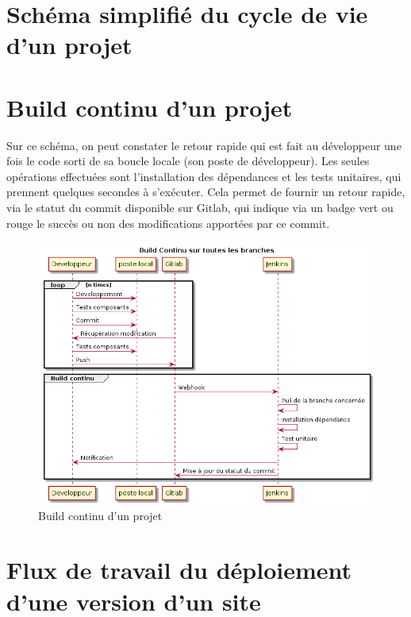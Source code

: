 \section{Schéma simplifié du cycle de vie d'un projet}

\clearpage
\section{Build continu d'un projet \naq}

Sur ce schéma, on peut constater le retour rapide qui est fait au développeur une fois le code sorti de sa boucle locale (son poste de développeur). Les seules opérations effectuées sont l'installation des dépendances et les tests unitaires, qui prennent quelques secondes à s'exécuter. Cela permet de fournir un retour rapide, via le statut du commit disponible sur Gitlab, qui indique via un badge vert ou rouge le succès ou non des modifications apportées par ce commit.

\begin{figure}[ht]
	\centering
	\includegraphics[scale=0.6,angle=-90]{img/build-continu.png}
	\caption{Build continu d'un projet \naq}
	\label{annexe:build-continu}
\end{figure}

\clearpage
\section{Flux de travail du déploiement d'une version d'un site \naq}

